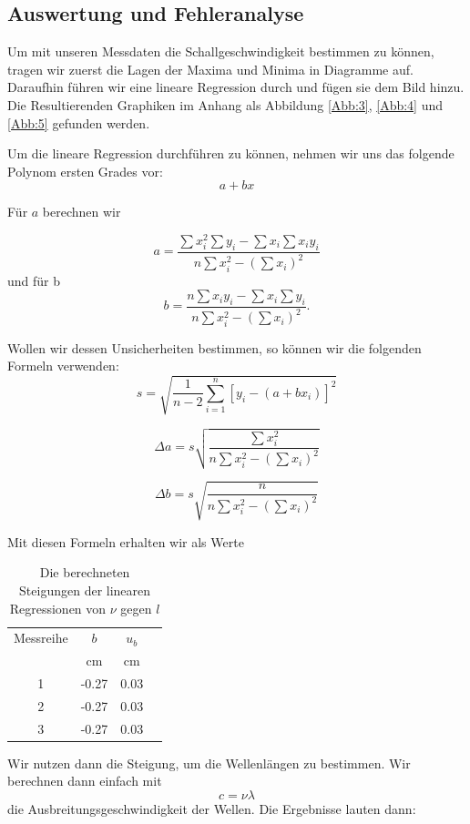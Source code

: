 \documentclass[11pt,a4paper]{article}
\begin{document}
\subsection{Auswertung und Fehleranalyse}

Um mit unseren Messdaten die Schallgeschwindigkeit bestimmen zu k\"onnen, tragen wir zuerst die Lagen der Maxima und Minima in Diagramme auf. Daraufhin f\"uhren wir eine lineare Regression durch und f\"ugen sie dem Bild hinzu. Die Resultierenden Graphiken im Anhang als Abbildung \ref{Abb:3}, \ref{Abb:4} und \ref{Abb:5} gefunden werden.

Um die lineare Regression durchf\"uhren zu k\"onnen, nehmen wir uns das folgende Polynom ersten Grades vor:
\[ a+bx\]

F\"ur $a$ berechnen wir

\[a=\frac{\sum x_i^2\sum y_i-\sum x_i\sum x_iy_i}{n\sum x_i^2-(\sum x_i)^2}\]
und f\"ur b
\[b=\frac{n\sum x_iy_i-\sum x_i\sum y_i}{n\sum x_i^2-(\sum x_i)^2}.\]

Wollen wir dessen Unsicherheiten bestimmen, so k\"onnen wir die folgenden Formeln verwenden:
\[
s=\sqrt{\frac{1}{n-2}\sum^n_{i=1}[y_i-(a+bx_i)]^2}\]

\[\Delta a=s\sqrt{\frac{\sum x_i^2}{n\sum x_i^2-(\sum x_i)^2}}\]

\[\Delta b=s\sqrt{\frac{n}{n\sum x_i^2-(\sum x_i)^2}}\]

Mit diesen Formeln erhalten wir als Werte

\begin{table}[h]
	\centering
	\begin{tabular*}{0.50\textwidth}{@{\extracolsep{\fill}}cccc}
		\toprule
		Messreihe & $b$ & $u_b$ \\
		& cm & cm\\
		1 & -0.27 & 0.03\\
		2 & -0.27 & 0.03\\
		3 & -0.27 & 0.03\\
		\bottomrule
	\end{tabular*}
\caption{Die berechneten Steigungen der linearen Regressionen von $\nu$ gegen $l$}
\label{Table1}
\end{table}

Wir nutzen dann die Steigung, um die Wellenl\"angen zu bestimmen. Wir berechnen dann einfach mit
\begin{equation}
c=\nu\lambda
\end{equation}
die Ausbreitungsgeschwindigkeit der Wellen. Die Ergebnisse lauten dann:
\end{document}
